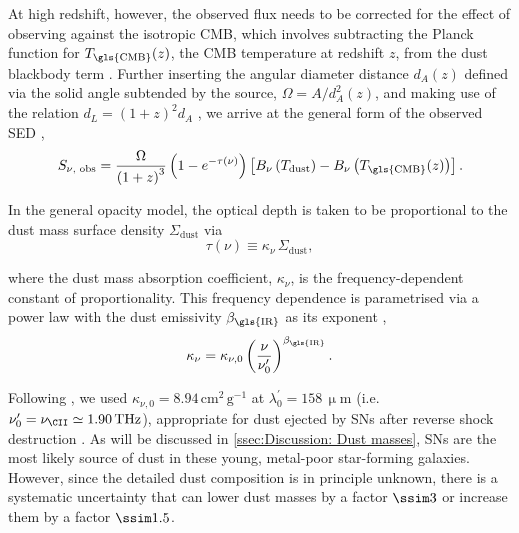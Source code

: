  At high redshift, however, the observed flux needs to be corrected for the effect of observing against the isotropic \gls{CMB}, which involves subtracting the Planck function for $T_\text{\gls{CMB}} (z)$, the \gls{CMB} temperature at redshift $z$, from the dust blackbody term \citep[as in equation (18) in][]{2013ApJ...766...13D}. Further inserting the angular diameter distance $d_A(z)$ defined via the solid angle subtended by the source, $\Omega = A / d_A^2(z)$, and making use of the relation $d_L = \left( 1+z \right)^2 d_A$ \citep{1999astro.ph..5116H}, we arrive at the general form of the observed \gls{SED} \citep[see also][]{2020MNRAS.498.4109J},
\begin{equation}
    \label{eq:General dust SED flux density}
    S_{\nu\text{, obs}} = \frac{\Omega}{\left( 1+z \right)^3} \left( 1 - e^{-\tau (\nu)} \right) \left[ B_\nu \left(T_\text{dust} \right) - B_\nu \left(T_\text{\gls{CMB}} (z) \right) \right].
\end{equation}

In the general opacity model, the optical depth is taken to be proportional to the dust mass surface density $\Sigma_\text{dust}$ \citep{2014PhR...541...45C} via
\begin{equation}
    \label{eq:Dust mass absorption coefficient definition}
    \tau (\nu) \equiv \kappa_\nu \, \Sigma_\text{dust},
\end{equation}

where the dust mass absorption coefficient, $\kappa_\nu$, is the frequency-dependent constant of proportionality. This frequency dependence is parametrised via a power law with the dust emissivity $\beta_\text{\gls{IR}}$ as its exponent \citep{2006ApJ...636.1114D},
\begin{equation}
    \label{eq:Dust mass absorption coefficient form}
    \kappa_\nu = \kappa_{\nu, 0} \left( \frac{\nu}{\nu_0^\prime} \right)^{\beta_\text{\gls{IR}}}.
\end{equation}

 Following \citet{2021arXiv210512133S}, we used $\kappa_{\nu, 0} = 8.94 \, \mathrm{cm^2 \, g^{-1}}$ at $\lambda_0^\prime = 158 \, \mathrm{\upmu m}$ (i.e. $\nu_0^\prime = \nu_\CII \simeq 1.90 \, \mathrm{THz}$), appropriate for dust ejected by \glspl{SN} after reverse shock destruction \citep{2014MNRAS.443.1704H}. As will be discussed in \cref{ssec:Discussion: Dust masses}, \glspl{SN} are the most likely source of dust in these young, metal-poor star-forming galaxies. However, since the detailed dust composition is in principle unknown, there is a systematic uncertainty that can lower dust masses by a factor $\ssim 3$ or increase them by a factor $\ssim 1.5$.

